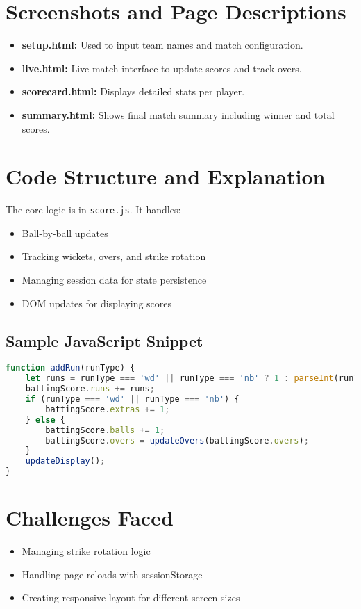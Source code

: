 \documentclass[12pt]{article}
\begin{document}
\section{Screenshots and Page Descriptions}
\begin{itemize}
    \item \textbf{setup.html:} Used to input team names and match configuration.
    \item \textbf{live.html:} Live match interface to update scores and track overs.
    \item \textbf{scorecard.html:} Displays detailed stats per player.
    \item \textbf{summary.html:} Shows final match summary including winner and total scores.
\end{itemize}

\section{Code Structure and Explanation}
The core logic is in \texttt{score.js}. It handles:
\begin{itemize}
    \item Ball-by-ball updates
    \item Tracking wickets, overs, and strike rotation
    \item Managing session data for state persistence
    \item DOM updates for displaying scores
\end{itemize}

\subsection{Sample JavaScript Snippet}
\begin{lstlisting}[language=JavaScript, basicstyle=\ttfamily\small, breaklines=true]
function addRun(runType) {
    let runs = runType === 'wd' || runType === 'nb' ? 1 : parseInt(runType);
    battingScore.runs += runs;
    if (runType === 'wd' || runType === 'nb') {
        battingScore.extras += 1;
    } else {
        battingScore.balls += 1;
        battingScore.overs = updateOvers(battingScore.overs);
    }
    updateDisplay();
}
\end{lstlisting}

\section{Challenges Faced}
\begin{itemize}
    \item Managing strike rotation logic
    \item Handling page reloads with sessionStorage
    \item Creating responsive layout for different screen sizes
\end{itemize}
\end{document}
